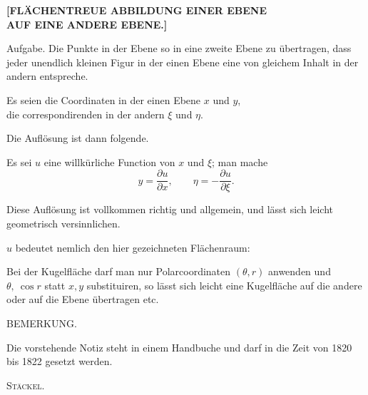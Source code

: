 \clearpage
{}%
\begin{center}\large\bfseries [FLÄCHENTREUE ABBILDUNG EINER EBENE\\ AUF EINE ANDERE EBENE.]\end{center}

Aufgabe. Die Punkte in der Ebene so in eine zweite Ebene zu übertragen, dass jeder unendlich kleinen Figur in der einen Ebene eine von gleichem Inhalt in der andern entspreche.

Es seien die Coordinaten in der einen Ebene $x$ und $y$,\\
\hspace*{1.6em}die correspondirenden in der andern $\xi$ und $\eta$.

\noindent Die  Auflösung ist dann folgende.

Es sei $u$ eine willkürliche Function von $x$ und $\xi$; man mache
\[
y=\frac{\partial u}{\partial x},\qquad \eta=-\frac{\partial u}{\partial\xi}.
\]

\indent Diese Auflösung ist vollkommen richtig und allgemein, und lässt sich leicht geometrisch versinnlichen.

$u$ bedeutet nemlich den hier gezeichneten Flächenraum:
\begin{center}\end{center}

Bei der Kugelfläche darf man nur Polarcoordinaten $(\theta,r)$ anwenden und $\theta,\ \cos r$ statt $x,y$ substituiren, so lässt sich leicht eine Kugelfläche auf die andere oder auf die Ebene übertragen etc.

\begin{center}BEMERKUNG.\end{center}

Die vorstehende Notiz steht in einem Handbuche und darf in die Zeit von 1820 bis 1822 gesetzt werden.
\begin{flushright}\textsc{Stäckel}.\end{flushright}
